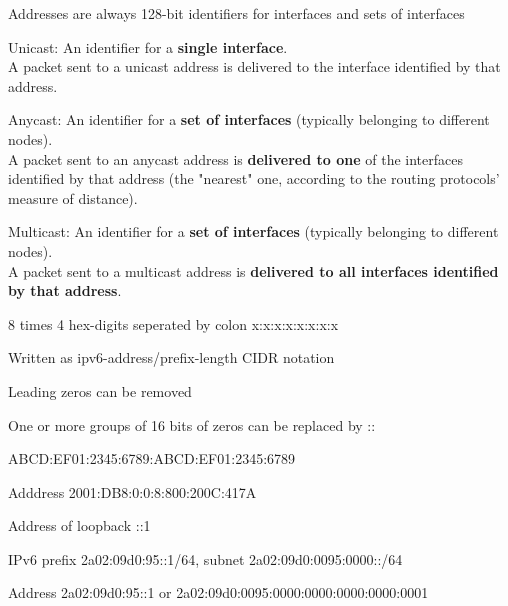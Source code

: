 \documentclass[Screen16to9,17pt]{foils}
\begin{document}

\begin{list1}
\item Addresses are always 128-bit identifiers for interfaces and sets of
   interfaces
\item Unicast:   An identifier for a {\bf single interface}.\\
A packet sent to a
               unicast address is delivered to the interface identified
               by that address.
\item Anycast:   An identifier for a {\bf set of interfaces} (typically
               belonging to different nodes).\\  A packet sent to an
               anycast address is {\bf delivered to one} of the interfaces
               identified by that address (the "nearest" one, according
               to the routing protocols' measure of distance).

\item Multicast: An identifier for a {\bf set of interfaces} (typically
               belonging to different nodes). \\ A packet sent to a
               multicast address is {\bf delivered to all interfaces
               identified by that address}.
\end{list1}



\begin{list1}
\item 8 times 4 hex-digits seperated by colon x:x:x:x:x:x:x:x
\item Written as ipv6-address/prefix-length CIDR notation
\item Leading zeros can be removed
\item One or more groups of 16 bits of zeros can be replaced by ::
\end{list1}


\begin{list2}
\item ABCD:EF01:2345:6789:ABCD:EF01:2345:6789

\item Adddress 2001:DB8:0:0:8:800:200C:417A
\item Address of loopback ::1
\item IPv6 prefix 2a02:09d0:95::1/64, subnet 2a02:09d0:0095:0000::/64
\item Address 2a02:09d0:95::1 or 2a02:09d0:0095:0000:0000:0000:0000:0001
\end{list2}
\end{document}
